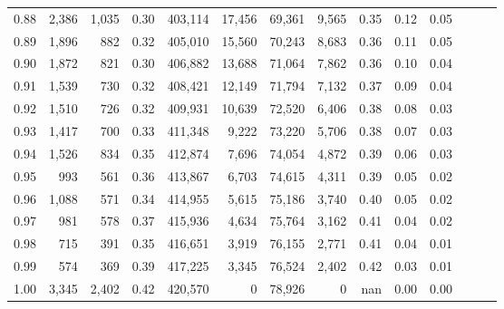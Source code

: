 \begin{tabular}{rrrrrrrrrrrrrr}
0.88 &   2,386 &  1,035 &  0.30 &  403,114 &   17,456 &  69,361 &   9,565 &  0.35 &  0.12 &      0.05 \\
0.89 &   1,896 &    882 &  0.32 &  405,010 &   15,560 &  70,243 &   8,683 &  0.36 &  0.11 &      0.05 \\
0.90 &   1,872 &    821 &  0.30 &  406,882 &   13,688 &  71,064 &   7,862 &  0.36 &  0.10 &      0.04 \\
0.91 &   1,539 &    730 &  0.32 &  408,421 &   12,149 &  71,794 &   7,132 &  0.37 &  0.09 &      0.04 \\
0.92 &   1,510 &    726 &  0.32 &  409,931 &   10,639 &  72,520 &   6,406 &  0.38 &  0.08 &      0.03 \\
0.93 &   1,417 &    700 &  0.33 &  411,348 &    9,222 &  73,220 &   5,706 &  0.38 &  0.07 &      0.03 \\
0.94 &   1,526 &    834 &  0.35 &  412,874 &    7,696 &  74,054 &   4,872 &  0.39 &  0.06 &      0.03 \\
0.95 &     993 &    561 &  0.36 &  413,867 &    6,703 &  74,615 &   4,311 &  0.39 &  0.05 &      0.02 \\
0.96 &   1,088 &    571 &  0.34 &  414,955 &    5,615 &  75,186 &   3,740 &  0.40 &  0.05 &      0.02 \\
0.97 &     981 &    578 &  0.37 &  415,936 &    4,634 &  75,764 &   3,162 &  0.41 &  0.04 &      0.02 \\
0.98 &     715 &    391 &  0.35 &  416,651 &    3,919 &  76,155 &   2,771 &  0.41 &  0.04 &      0.01 \\
0.99 &     574 &    369 &  0.39 &  417,225 &    3,345 &  76,524 &   2,402 &  0.42 &  0.03 &      0.01 \\
1.00 &   3,345 &  2,402 &  0.42 &  420,570 &        0 &  78,926 &       0 &   nan &  0.00 &      0.00 \\
\bottomrule
\end{tabular}
